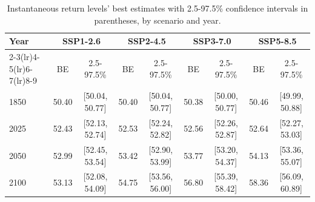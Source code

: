 \begin{table}[htbp]
\centering
\begin{tabular}{lcccccccc}
\toprule
Year & \multicolumn{2}{c}{\textbf{SSP1-2.6}} & \multicolumn{2}{c}{\textbf{SSP2-4.5}} & \multicolumn{2}{c}{\textbf{SSP3-7.0}} & \multicolumn{2}{c}{\textbf{SSP5-8.5}} \\
\cmidrule(lr){2-3}\cmidrule(lr){4-5}\cmidrule(lr){6-7}\cmidrule(lr){8-9}
 & BE & 2.5-97.5\% & BE & 2.5-97.5\% & BE & 2.5-97.5\% & BE & 2.5-97.5\% \\
\midrule
1850 & 50.40 & [50.04, 50.77] & 50.40 & [50.04, 50.77] & 50.38 & [50.00, 50.77] & 50.46 & [49.99, 50.88] \\
2025 & 52.43 & [52.13, 52.74] & 52.53 & [52.24, 52.82] & 52.56 & [52.26, 52.87] & 52.64 & [52.27, 53.03] \\
2050 & 52.99 & [52.45, 53.54] & 53.42 & [52.90, 53.99] & 53.77 & [53.20, 54.37] & 54.13 & [53.36, 55.07] \\
2100 & 53.13 & [52.08, 54.09] & 54.75 & [53.56, 56.00] & 56.80 & [55.39, 58.42] & 58.36 & [56.09, 60.89] \\
\bottomrule
\end{tabular}
\caption{Instantaneous return levels' best estimates with 2.5-97.5\% confidence intervals in parentheses, by scenario and year.}
\label{tab:scenarios}
\end{table}